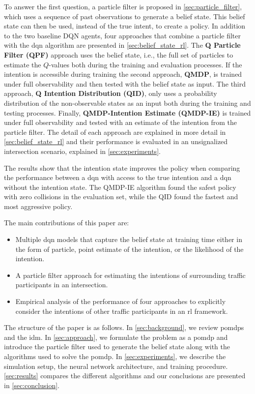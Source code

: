 To answer the first question, a particle filter is proposed in \ref{sec:particle_filter}, which uses a sequence of past observations to generate a belief state. This belief state can then be used, instead of the true intent, to create a policy. 
In addition to the two baseline DQN agents, four approaches that combine a particle filter with the \gls{dqn} algorithm are presented in \ref{sec:belief_state_rl}. The \textbf{Q Particle Filter (QPF)} approach uses the belief state, i.e., the full set of particles to estimate the $Q$-values both during the training and evaluation processes. 
If the intention is accessible during training the second approach, \textbf{QMDP}, is trained under full observability and then tested with the belief state as input. The third approach, \textbf{Q Intention Distribution (QID)}, only uses a probability distribution of the non-observable states as an input both during the training and testing processes. Finally, \textbf{QMDP-Intention Estimate (QMDP-IE)} is trained under full observability and tested with an estimate of the intention from the particle filter. The detail of each approach are explained in more detail in \ref{sec:belief_state_rl} and their performance is evaluated in an unsignalized intersection scenario, explained in \ref{sec:experiments}.


The results show that the intention state improves the policy when comparing the performance between a \gls{dqn} with access to the true intention and a \gls{dqn} without the intention state. The QMDP-IE algorithm found the safest policy with zero collisions in the evaluation set, while the QID found the fastest and most aggressive policy.

The main contributions of this paper are: 
\begin{itemize}
    \item Multiple \gls{dqn} models that capture the belief state at training time either in the form of particle, point estimate of the intention, or the likelihood of the intention.
    \item A particle filter approach for estimating the intentions of surrounding traffic participants in an intersection.
    \item Empirical analysis of the performance of four approaches to explicitly consider the intentions of other traffic participants in an \gls{rl} framework.

\end{itemize}


The structure of the paper is as follows. In \ref{sec:background}, we review \gls{pomdp}s and the \gls{idm}. In \ref{sec:approach}, we formulate the problem as a \gls{pomdp} and introduce the particle filter used to generate the belief state along with the algorithms used to solve the \gls{pomdp}. In \ref{sec:experiments}, we describe the simulation setup, the neural network architecture, and training procedure. \ref{sec:results} compares the different algorithms and our conclusions are presented in \ref{sec:conclusion}. 

